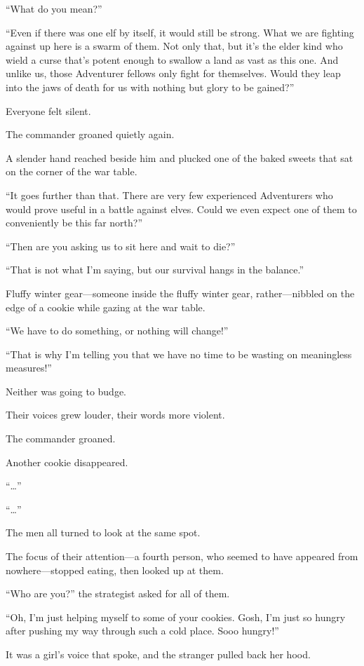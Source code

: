 “What do you mean?”

“Even if there was one elf by itself, it would still be strong. What we are fighting against up here is a swarm of them. Not only that, but it’s the elder kind who wield a curse that’s potent enough to swallow a land as vast as this one. And unlike us, those Adventurer fellows only fight for themselves. Would they leap into the jaws of death for us with nothing but glory to be gained?”

Everyone felt silent.

The commander groaned quietly again.

A slender hand reached beside him and plucked one of the baked sweets that sat on the corner of the war table.

“It goes further than that. There are very few experienced Adventurers who would prove useful in a battle against elves. Could we even expect one of them to conveniently be this far north?”

“Then are you asking us to sit here and wait to die?”

“That is not what I’m saying, but our survival hangs in the balance.”

Fluffy winter gear—someone inside the fluffy winter gear, rather—nibbled on the edge of a cookie while gazing at the war table.

“We have to do something, or nothing will change!”

“That is why I’m telling you that we have no time to be wasting on meaningless measures!”

Neither was going to budge.

Their voices grew louder, their words more violent.

The commander groaned.

Another cookie disappeared.

“…”

“…”

The men all turned to look at the same spot.

The focus of their attention—a fourth person, who seemed to have appeared from nowhere—stopped eating, then looked up at them.

“Who are you?” the strategist asked for all of them.

“Oh, I’m just helping myself to some of your cookies. Gosh, I’m just so hungry after pushing my way through such a cold place. Sooo hungry!”

It was a girl’s voice that spoke, and the stranger pulled back her hood.

